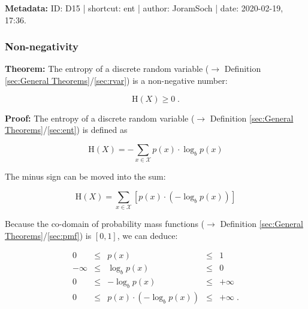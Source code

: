 \documentclass[a4paper,12pt,twoside]{book}
\begin{document}
\vspace{1em}
\textbf{Metadata:} ID: D15 | shortcut: ent | author: JoramSoch | date: 2020-02-19, 17:36.
\vspace{1em}



\subsubsection[\textbf{Non-negativity}]{Non-negativity} \label{sec:ent-nonneg}
\setcounter{equation}{0}

\textbf{Theorem:} The entropy of a discrete random variable ($\rightarrow$ Definition \ref{sec:General Theorems}/\ref{sec:rvar}) is a non-negative number:

\begin{equation} \label{eq:ent-nonneg-ent-nonneg}
\mathrm{H}(X) \geq 0 \; .
\end{equation}


\vspace{1em}
\textbf{Proof:} The entropy of a discrete random variable ($\rightarrow$ Definition \ref{sec:General Theorems}/\ref{sec:ent}) is defined as

\begin{equation} \label{eq:ent-nonneg-ent}
\mathrm{H}(X) = - \sum_{x \in \mathcal{X}} p(x) \cdot \log_b p(x)
\end{equation}

The minus sign can be moved into the sum:

\begin{equation} \label{eq:ent-nonneg-ent-dev}
\mathrm{H}(X) = \sum_{x \in \mathcal{X}} \left[ p(x) \cdot \left( - \log_b p(x) \right) \right]
\end{equation}

Because the co-domain of probability mass functions ($\rightarrow$ Definition \ref{sec:General Theorems}/\ref{sec:pmf}) is $[0,1]$, we can deduce:

\begin{equation} \label{eq:ent-nonneg-nonneg}
\begin{array}{rcccl}
0 &\leq &p(x) &\leq &1 \\
-\infty &\leq &\log_b p(x) &\leq &0 \\
0 &\leq &-\log_b p(x) &\leq &+\infty \\
0 &\leq &p(x) \cdot \left(-\log_b p(x)\right) &\leq &+\infty \; .
\end{array}
\end{equation}
\end{document}
